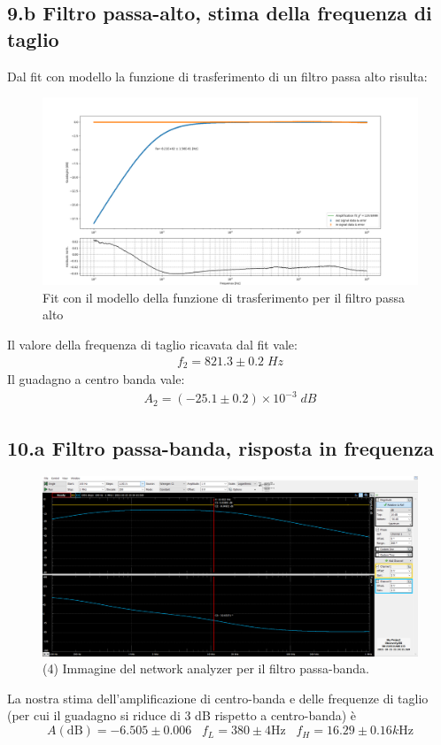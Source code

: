\documentclass[10pt, a4paper, italian]{article}
\begin{document}
\subsection*{9.b Filtro passa-alto, stima della frequenza di taglio}
Dal fit con modello la funzione di trasferimento di un filtro passa alto risulta:
\begin{figure}[htb]
\centering
\includegraphics[scale=0.35]{passa_alto}
\caption{Fit con il modello della funzione di trasferimento per il filtro passa alto}
\end{figure}
Il valore della frequenza di taglio ricavata dal fit vale:
\begin{align*}
f_2 = 821.3 \pm 0.2 \; \si{Hz}
\end{align*}
Il guadagno a centro banda vale:
\begin{align*}
A_2 = (-25.1 \pm 0.2) \times 10^{-3} \; \si{dB}
\end{align*}
\subsection*{10.a Filtro passa-banda, risposta in frequenza}
\begin{figure}[htb]
\centering
\includegraphics[scale=0.35]{passabanda}
\caption{(4) Immagine del network analyzer per il filtro passa-banda.}
\end{figure}
La nostra stima dell'amplificazione di centro-banda e delle frequenze di 
taglio (per cui il guadagno si riduce di 3 dB rispetto a centro-banda) \`e
\[
A(\mathrm{dB}) = -6.505 \pm 0.006 \;\;\; f_{L} = 380 \pm 4 \si{\Hz} \;\;\;
f_{H} = 16.29 \pm 0.16 \si{k\Hz}
\]
\end{document}

